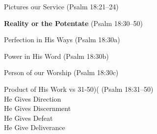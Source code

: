\begin{compactenum}[I.]
\begin{compactenum}[A.]
    		\item Pictures our Service   (Psalm 18:21--24)
	\end{compactenum}
	\item \textbf{Reality or the Potentate}   (Psalm 18:30--50)
    \begin{compactenum}[A.]
    		\item Perfection in His Ways   (Psalm 18:30a)
    		\item Power in His Word   (Psalm 18:30b)
    		\item Person of our Worship   (Psalm 18:30c)
    		\item Product of His Work vs 31-50)(  (Psalm 18:31--50) \\
    		He Gives Direction \\
    		He Gives Discernment \\
    		He Gives Defeat \\
    		He Give Deliverance
	\end{compactenum}
\end{compactenum}

